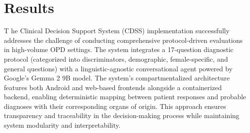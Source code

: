 \section{Results}
\lettrine{T}{ }he Clinical Decision Support System (CDSS) implementation successfully addresses the challenge of conducting comprehensive protocol-driven evaluations in high-volume OPD settings. The system integrates a 17-question diagnostic protocol (categorized into discriminators, demographic, female-specific, and general questions) with a linguistic-agnostic conversational agent powered by Google's Gemma 2 9B model. The system's compartmentalized architecture features both Android and web-based frontends alongside a containerized backend, enabling deterministic mapping between patient responses and probable diagnoses with their corresponding organs of origin. This approach ensures transparency and traceability in the decision-making process while maintaining system modularity and interpretability.


